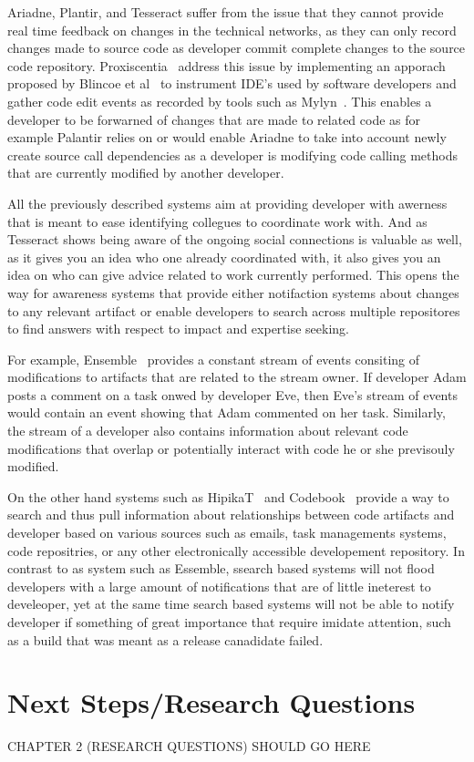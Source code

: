 Ariadne, Plantir, and Tesseract suffer from the issue that they cannot provide real time feedback on changes in the technical networks, as they can only record changes made to source code as developer commit complete changes to the source code repository. 
Proxiscentia~\cite{} address this issue by implementing an apporach proposed by Blincoe et al~\cite{} to instrument IDE's used by software developers and gather code edit events as recorded by tools such as Mylyn~\cite{}.
This enables a developer to be forwarned of changes that are made to related code as for example Palantir relies on or would enable Ariadne to take into account newly create source call dependencies as a developer is modifying code calling methods that are currently modified by another developer.

All the previously described systems aim at providing developer with awerness that is meant to ease identifying collegues to coordinate work with.
And as Tesseract shows being aware of the ongoing social connections is valuable as well, as it gives you an idea who one already coordinated with, it also gives you an idea on who can give advice related to work currently performed.
This opens the way for awareness systems that provide either notifaction systems about changes to any relevant artifact or enable developers to search across multiple repositores to find answers with respect to impact and expertise seeking.

For example, Ensemble~\cite{} provides a constant stream of events consiting of modifications to artifacts that are related to the stream owner.
If developer Adam posts a comment on a task onwed by developer Eve, then Eve's stream of events would contain an event showing that Adam commented on her task.
Similarly, the stream of a developer also contains information about relevant code modifications that overlap or potentially interact with code he or she previsouly modified.

On the other hand systems such as HipikaT~\cite{} and Codebook~\cite{} provide a way to search and thus pull information about relationships between code artifacts and developer based on various sources such as emails, task managements systems, code repositries, or any other electronically accessible developement repository.
In contrast to as system such as Essemble, ssearch based systems will not flood developers with a large amount of notifications that are of little ineterest to develeoper, yet at the same time search based systems will not be able to notify developer if something of great importance that require imidate attention, such as a build that was meant as a release canadidate failed.

\section{Next Steps/Research Questions}

CHAPTER 2 (RESEARCH QUESTIONS) SHOULD GO HERE
